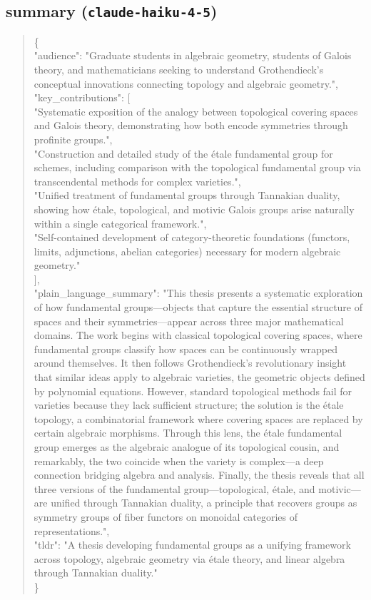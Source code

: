 \documentclass[11pt]{article}
\begin{document}
\subsection*{summary (\texttt{claude-haiku-4-5})}
\begin{quote}\small\ttfamily\raggedright
\{\\
  "audience": "Graduate students in algebraic geometry, students of Galois theory, and mathematicians seeking to understand Grothendieck's conceptual innovations connecting topology and algebraic geometry.",\\
  "key\_contributions": [\\
    "Systematic exposition of the analogy between topological covering spaces and Galois theory, demonstrating how both encode symmetries through profinite groups.",\\
    "Construction and detailed study of the étale fundamental group for schemes, including comparison with the topological fundamental group via transcendental methods for complex varieties.",\\
    "Unified treatment of fundamental groups through Tannakian duality, showing how étale, topological, and motivic Galois groups arise naturally within a single categorical framework.",\\
    "Self-contained development of category-theoretic foundations (functors, limits, adjunctions, abelian categories) necessary for modern algebraic geometry."\\
  ],\\
  "plain\_language\_summary": "This thesis presents a systematic exploration of how fundamental groups---objects that capture the essential structure of spaces and their symmetries---appear across three major mathematical domains. The work begins with classical topological covering spaces, where fundamental groups classify how spaces can be continuously wrapped around themselves. It then follows Grothendieck's revolutionary insight that similar ideas apply to algebraic varieties, the geometric objects defined by polynomial equations. However, standard topological methods fail for varieties because they lack sufficient structure; the solution is the étale topology, a combinatorial framework where covering spaces are replaced by certain algebraic morphisms. Through this lens, the étale fundamental group emerges as the algebraic analogue of its topological cousin, and remarkably, the two coincide when the variety is complex---a deep connection bridging algebra and analysis. Finally, the thesis reveals that all three versions of the fundamental group---topological, étale, and motivic---are unified through Tannakian duality, a principle that recovers groups as symmetry groups of fiber functors on monoidal categories of representations.",\\
  "tldr": "A thesis developing fundamental groups as a unifying framework across topology, algebraic geometry via étale theory, and linear algebra through Tannakian duality."\\
\}\\
\end{quote}
\end{document}
